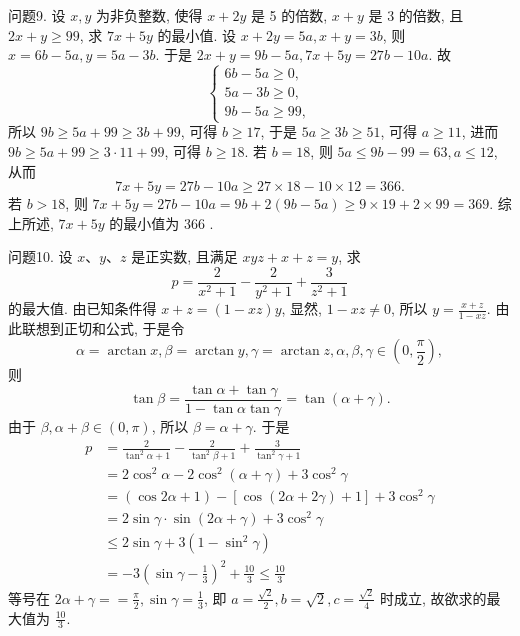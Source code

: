 问题9. 设 $x, y$ 为非负整数, 使得 $x+2 y$ 是 5 的倍数, $x+y$ 是 3 的倍数, 且 $2 x+ y \geqslant 99$, 求 $7 x+5 y$ 的最小值.
设 $x+2 y=5 a, x+y=3 b$, 则 $x=6 b-5 a, y=5 a-3 b$. 于是 $2 x+ y=9 b-5 a, 7 x+5 y=27 b-10 a$. 故
$$
\left\{\begin{array}{l}
6 b-5 a \geqslant 0, \\
5 a-3 b \geqslant 0, \\
9 b-5 a \geqslant 99,
\end{array}\right.
$$
所以 $9 b \geqslant 5 a+99 \geqslant 3 b+99$, 可得 $b \geqslant 17$, 于是 $5 a \geqslant 3 b \geqslant 51$, 可得 $a \geqslant 11$, 进而 $9 b \geqslant 5 a+99 \geqslant 3 \cdot 11+99$, 可得 $b \geqslant 18$.
若 $b=18$, 则 $5 a \leqslant 9 b-99=63, a \leqslant 12$, 从而
$$
7 x+5 y=27 b-10 a \geqslant 27 \times 18-10 \times 12=366 .
$$
若 $b>18$, 则 $7 x+5 y=27 b-10 a=9 b+2(9 b-5 a) \geqslant 9 \times 19+2 \times 99=369$.
综上所述, $7 x+5 y$ 的最小值为 366 .



问题10. 设 $x 、 y 、 z$ 是正实数, 且满足 $x y z+x+z=y$, 求
$$
p=\frac{2}{x^2+1}-\frac{2}{y^2+1}+\frac{3}{z^2+1}
$$
的最大值.
由已知条件得 $x+z=(1-x z) y$, 显然, $1-x z \neq 0$, 所以 $y= \frac{x+z}{1-x z}$. 由此联想到正切和公式, 于是令
$$
\alpha=\arctan x, \beta=\arctan y, \gamma=\arctan z, \alpha, \beta, \gamma \in\left(0, \frac{\pi}{2}\right),
$$
则
$$
\tan \beta=\frac{\tan \alpha+\tan \gamma}{1-\tan \alpha \tan \gamma}=\tan (\alpha+\gamma) .
$$
由于 $\beta, \alpha+\beta \in(0, \pi)$, 所以 $\beta=\alpha+\gamma$. 于是
$$
\begin{aligned}
p & =\frac{2}{\tan ^2 \alpha+1}-\frac{2}{\tan ^2 \beta+1}+\frac{3}{\tan ^2 \gamma+1} \\
& =2 \cos ^2 \alpha-2 \cos ^2(\alpha+\gamma)+3 \cos ^2 \gamma \\
& =(\cos 2 \alpha+1)-[\cos (2 \alpha+2 \gamma)+1]+3 \cos ^2 \gamma \\
& =2 \sin \gamma \cdot \sin (2 \alpha+\gamma)+3 \cos ^2 \gamma \\
& \leqslant 2 \sin \gamma+3\left(1-\sin ^2 \gamma\right) \\
& =-3\left(\sin \gamma-\frac{1}{3}\right)^2+\frac{10}{3} \leqslant \frac{10}{3}
\end{aligned}
$$
等号在 $2 \alpha+\gamma==\frac{\pi}{2}, \sin \gamma=\frac{1}{3}$, 即 $a=\frac{\sqrt{2}}{2}, b=\sqrt{2}, c=\frac{\sqrt{2}}{4}$ 时成立, 故欲求的最大值为 $\frac{10}{3}$.


